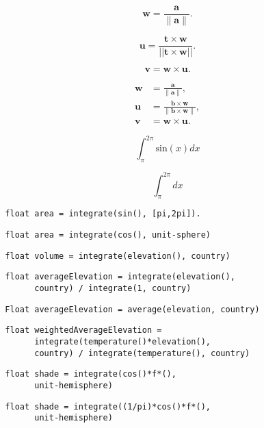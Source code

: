\documentclass[lang=cn,12pt]{elegantbook}
\begin{document}
$$
  \mathbf{w}={\frac{\mathbf{a}}{\|\mathbf{a}\|}}.
$$

$$
  \mathbf{u}={\frac{\mathbf{t}\times\mathbf{w}}{\left||\mathbf{t}\times\mathbf{w}|\right|}}.
$$

$$
  \mathbf{v}=\mathbf{w}\times\mathbf{u}.
$$

$$
  \begin{aligned}
    \mathbf{w} & ={\frac{\mathbf{a}}{\|\mathbf{a}\|}},                                 \\
    \mathbf{u} & ={\frac{\mathbf{b}\times\mathbf{w}}{\|\mathbf{b}\times\mathbf{w}\|}}, \\
    \mathbf{v} & =\mathbf{w}\times\mathbf{u}.
  \end{aligned}
$$

$$
  \int_{\pi}^{2\pi}\mathrm{sin}(x) dx
$$

$$
  \int_{\pi}^{2\pi} dx
$$

\begin{lstlisting}
  float area = integrate(sin(), [pi,2pi]).
\end{lstlisting}

\begin{lstlisting}
  float area = integrate(cos(), unit-sphere)
\end{lstlisting}

\begin{lstlisting}
  float volume = integrate(elevation(), country)
\end{lstlisting}

\begin{lstlisting}
  float averageElevation = integrate(elevation(),
        country) / integrate(1, country)
\end{lstlisting}

\begin{lstlisting}
  Float averageElevation = average(elevation, country)
\end{lstlisting}

\begin{lstlisting}
  float weightedAverageElevation =
        integrate(temperature()*elevation(),
        country) / integrate(temperature(), country)
\end{lstlisting}

\begin{lstlisting}
  float shade = integrate(cos()*f*(),
        unit-hemisphere)
\end{lstlisting}

\begin{lstlisting}
  float shade = integrate((1/pi)*cos()*f*(),
        unit-hemisphere)
\end{lstlisting}
\end{document}
